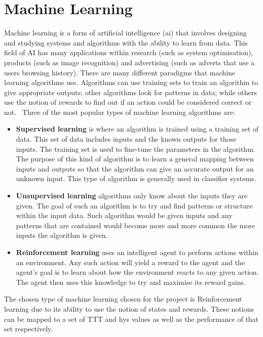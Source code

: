 \chapter{Machine Learning}\label{machine learning}
Machine learning is a form of artificial intelligence (\ac{ai}) that involves designing and studying systems and algorithms with the ability to learn from data. This field of AI has many applications within research (such as system optimisation), products (such as image recognition) and advertising (such as adverts that use a users browsing history). There are many different paradigms that machine learning algorithms use. Algorithms can use training sets to train an algorithm to give appropriate outputs; other algorithms look for patterns in data; while others use the notion of rewards to find out if an action could be considered correct or not.~\cite{alpaydin2010introduction} Three of the most popular types of machine learning algorithms are:

\begin{itemize}
  \item \textbf{Supervised learning} is where an algorithm is trained using a training set of data. This set of data includes inputs and the known outputs for those inputs. The training set is used to fine-tune the parameters in the algorithm. The purpose of this kind of algorithm is to learn a general mapping between inputs and outputs so that the algorithm can give an accurate output for an unknown input. This type of algorithm is generally used in classifier systems.
  \item \textbf{Unsupervised learning} algorithms only know about the inputs they are given. The goal of such an algorithm is to try and find patterns or structure within the input data. Such algorithm would be given inputs and any patterns that are contained would become more and more common the more inputs the algorithm is given.
  \item \textbf{Reinforcement learning} uses an intelligent agent to perform actions within an environment. Any such action will yield a reward to the agent and the agent’s goal is to learn about how the environment reacts to any given action. The agent then uses this knowledge to try and maximise its reward gains.
\end{itemize}

The chosen type of machine learning chosen for the project is Reinforcement learning due to its ability to use the notion of states and rewards. These notions can be mapped to a set of TTT and hys values as well as the performance of that set respectively.

